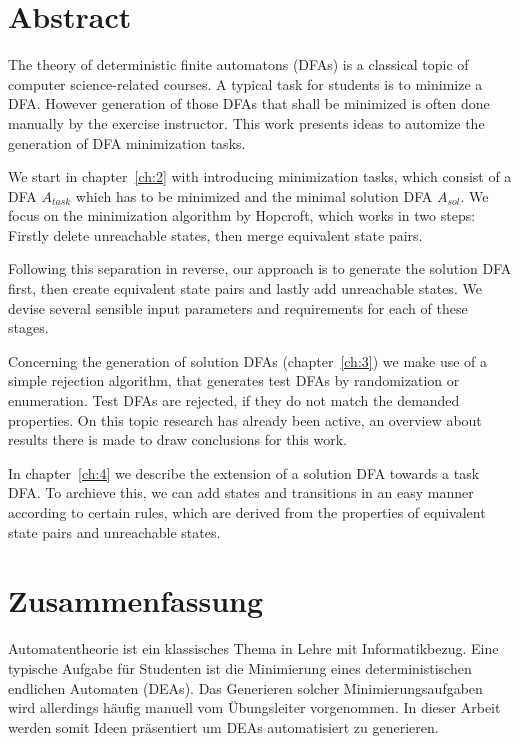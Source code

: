
\chapter{Abstract}

The theory of deterministic finite automatons (DFAs) is a classical topic of computer science-related courses. A typical task for students is to minimize a DFA. However generation of those DFAs that shall be minimized is often done manually by the exercise instructor. This work presents ideas to automize the generation of DFA minimization tasks.

We start in chapter~\ref{ch:2} with introducing minimization tasks, which consist of a DFA $A_{task}$ which has to be minimized and the minimal solution DFA $A_{sol}$. We focus on the minimization algorithm by Hopcroft, which works in two steps: Firstly delete unreachable states, then merge equivalent state pairs.

Following this separation in reverse, our approach is to generate the solution DFA first, then create equivalent state pairs and lastly add unreachable states. We devise several sensible input parameters and requirements for each of these stages.

Concerning the generation of solution DFAs (chapter~\ref{ch:3}) we make use of a simple rejection algorithm, that generates test DFAs by randomization or enumeration. Test DFAs are rejected, if they do not match the demanded properties. On this topic research has already been active, an overview about results there is made to draw conclusions for this work.

In chapter~\ref{ch:4} we describe the extension of a solution DFA towards a task DFA. To archieve this, we can add states and transitions in an easy manner according to certain rules, which are derived from the properties of equivalent state pairs and unreachable states.



\chapter{Zusammenfassung}

Automatentheorie ist ein klassisches Thema in Lehre mit Informatikbezug. Eine typische Aufgabe für Studenten ist die Minimierung eines deterministischen endlichen Automaten (DEAs). Das Generieren solcher Minimierungsaufgaben wird allerdings häufig manuell vom Übungsleiter vorgenommen. In dieser Arbeit werden somit Ideen präsentiert um DEAs automatisiert zu generieren.

